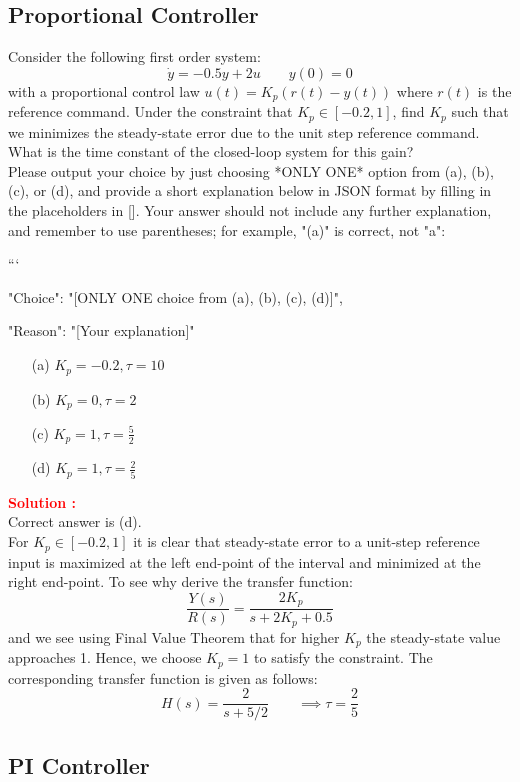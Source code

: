 \documentclass[12pt]{article}
\begin{document}
\subsection{Proportional Controller}

Consider the following first order system:
\[
\dot{y} = -0.5y + 2u \qquad  y(0) = 0
\]
with a proportional control law $u(t) = K_p(r(t) - y(t))$ where $r(t)$ is the reference command. Under the constraint that $K_p \in [-0.2, 1]$, find $K_p$ such that we minimizes the steady-state error due to the unit step reference command. What is the time constant of the closed-loop system for this gain?\\
 Please output your choice by just choosing *ONLY ONE* option from (a), (b), (c), or (d), and provide a short explanation below in JSON format by filling in the placeholders in []. Your answer should not include any further explanation, and remember to use parentheses; for example, "(a)" is correct, not "a":

```
{

"Choice": "[ONLY ONE choice from (a), (b), (c), (d)]",

"Reason": "[Your explanation]"

}

\begin{itemize}
    \item[(a)] \(K_p = -0.2, \tau = 10\)
    \item[(b)] \(K_p = 0, \tau = 2\)
    \item[(c)] \(K_p = 1, \tau = \frac{5}{2}\)
    \item[(d)] \(K_p = 1, \tau = \frac{2}{5}\)
\end{itemize}
\textbf{\textcolor{red}{Solution :}} \\
Correct answer is (d).\\
For $K_p \in [-0.2, 1]$ it is clear that steady-state error to a unit-step reference input is
maximized at the left end-point of the interval and minimized at the right end-point. To
see why derive the transfer function:
\[
\frac{Y(s)}{R(s)}=\frac{2 K_p}{s+2 K_p +0.5}
\]
and we see using Final Value Theorem that for higher $K_p$ the steady-state value approaches 1. Hence, we choose $K_p = 1$ to satisfy the constraint. The corresponding transfer function is given as follows:
\[
H(s) =\frac{2}{s+5/2} \qquad \implies \tau=\frac{2}{5}
\]
\clearpage

\subsection{PI Controller}
\end{document}
